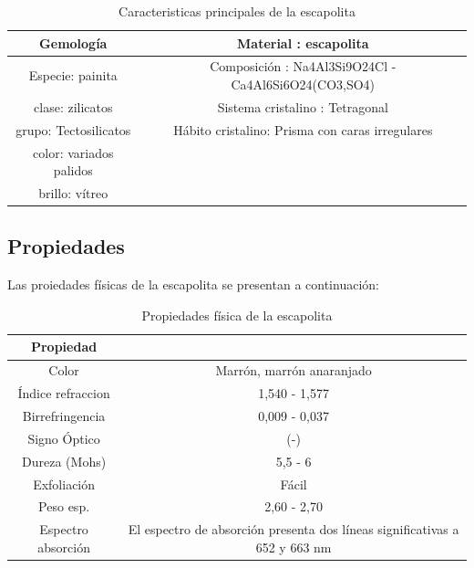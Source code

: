 \documentclass[12pt,a4paper]{article}
\begin{document}
\begin{table}[]
    \centering
    \begin{tabular}{|c|c|}
    \hline
      Gemología 	&   Material : escapolita	\\
      \hline
        Especie: painita 	& Composición  :	Na4Al3Si9O24Cl - Ca4Al6Si6O24(CO3,SO4)\\
        clase: zilicatos	& Sistema cristalino : Tetragonal 	\\
        grupo: Tectosilicatos	& Hábito  cristalino: Prisma con caras irregulares	\\
        color: variados palidos	&		\\
        brillo: vítreo	&		\\
    \hline
    \end{tabular}
    \caption{Caracteristicas principales de la escapolita}
    \label{tab:my_label}
\end{table}


\subsection{Propiedades}
 Las proiedades físicas de la escapolita se presentan a continuación: 
 
\begin{table}[H]
    \centering
    \begin{tabular}{|c|c|}
        \hline
        Propiedad & \\
        \hline
         Color &	Marrón, marrón anaranjado\\
        Índice refraccion &	1,540 - 1,577 \\
        Birrefringencia	& 0,009 - 0,037 \\
        Signo Óptico &	(-) \\
        Dureza (Mohs) &	5,5 - 6 \\
        Exfoliación	& Fácil \\
        Peso esp. &	2,60 - 2,70 \\
        Espectro absorción &El espectro de absorción presenta dos líneas significativas a 652 y 663 nm \\ 
        \hline
    \end{tabular}
    \caption{Propiedades física de la escapolita}
    \label{tab:my_label}
\end{table}
\end{document}
